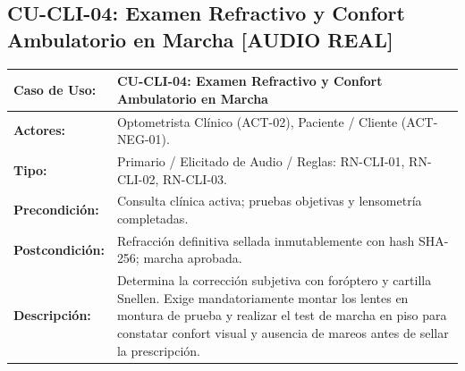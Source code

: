 \documentclass[12pt,a4paper]{report}
\begin{document}
\subsection{CU-CLI-04: Examen Refractivo y Confort Ambulatorio en Marcha [AUDIO REAL]}
\begin{table}[H]
\centering
\small
\begin{tabularx}{\textwidth}{|L{3.5cm}|X|}
\hline
{}\color{white}\textbf{Caso de Uso:} & \textbf{CU-CLI-04: Examen Refractivo y Confort Ambulatorio en Marcha} \\
\hline
\textbf{Actores:} & Optometrista Clínico (ACT-02), Paciente / Cliente (ACT-NEG-01). \\
\hline
\textbf{Tipo:} & Primario / Elicitado de Audio / Reglas: RN-CLI-01, RN-CLI-02, RN-CLI-03. \\
\hline
\textbf{Precondición:} & Consulta clínica activa; pruebas objetivas y lensometría completadas. \\
\hline
\textbf{Postcondición:} & Refracción definitiva sellada inmutablemente con hash SHA-256; marcha aprobada. \\
\hline
\textbf{Descripción:} & Determina la corrección subjetiva con foróptero y cartilla Snellen. Exige mandatoriamente montar los lentes en montura de prueba y realizar el test de marcha en piso para constatar confort visual y ausencia de mareos antes de sellar la prescripción. \\
\hline
\end{tabularx}
\end{table}
\end{document}
